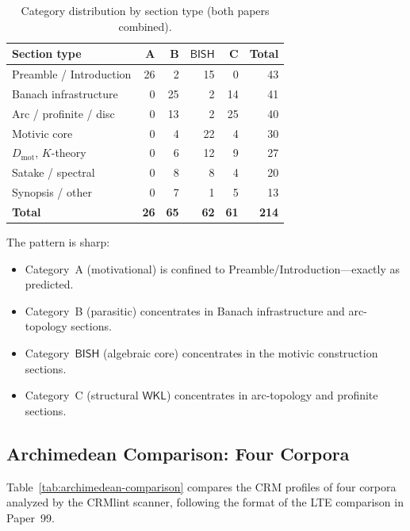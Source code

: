 \documentclass[11pt,a4paper]{article}
\theoremstyle{plain}
\theoremstyle{definition}
\newcommand{\BISH}{\textsf{BISH}}
\newcommand{\WKL}{\textsf{WKL}}
\newcommand{\Dmot}{D_{\mathrm{mot}}}
\begin{document}
\begin{table}[h]
\centering
\caption{Category distribution by section type (both papers combined).}
\label{tab:category-by-section}
\begin{tabular}{@{}lrrrrr@{}}
\toprule
\textbf{Section type} & \textbf{A} & \textbf{B} & \textbf{$\BISH$} & \textbf{C} & \textbf{Total} \\
\midrule
Preamble / Introduction & 26 &  2 & 15 &  0 &  43 \\
Banach infrastructure   &  0 & 25 &  2 & 14 &  41 \\
Arc / profinite / disc  &  0 & 13 &  2 & 25 &  40 \\
Motivic core            &  0 &  4 & 22 &  4 &  30 \\
$\Dmot$, $K$-theory     &  0 &  6 & 12 &  9 &  27 \\
Satake / spectral       &  0 &  8 &  8 &  4 &  20 \\
Synopsis / other        &  0 &  7 &  1 &  5 &  13 \\
\midrule
\textbf{Total}          & \textbf{26} & \textbf{65} & \textbf{62} & \textbf{61} & \textbf{214} \\
\bottomrule
\end{tabular}
\end{table}

The pattern is sharp:
\begin{itemize}
\item Category~A (motivational) is confined to Preamble/Introduction---exactly as predicted.
\item Category~B (parasitic) concentrates in Banach infrastructure and arc-topology sections.
\item Category~$\BISH$ (algebraic core) concentrates in the motivic construction sections.
\item Category~C (structural $\WKL$) concentrates in arc-topology and profinite sections.
\end{itemize}


\subsection{Archimedean Comparison: Four Corpora}

Table~\ref{tab:archimedean-comparison} compares the CRM profiles of four corpora analyzed by the CRMlint scanner, following the format of the LTE comparison in Paper~99.
\end{document}
